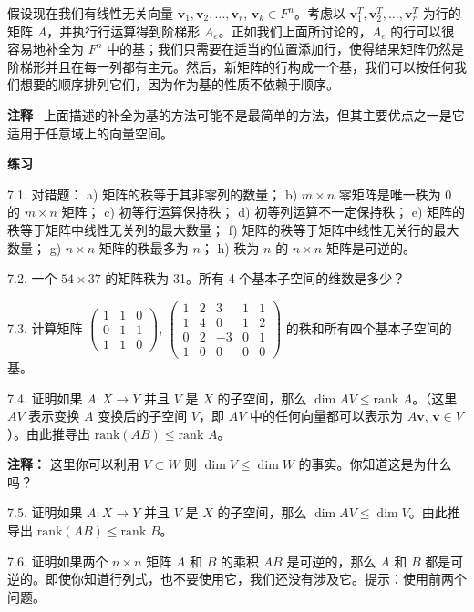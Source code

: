 假设现在我们有线性无关向量 $\mathbf{v}_1, \mathbf{v}_2, \dots, \mathbf{v}_r$, $\mathbf{v}_k \in F^n$。考虑以 $\mathbf{v}_1^T, \mathbf{v}_2^T, \dots, \mathbf{v}_r^T$ 为行的矩阵 $A$，并执行行运算得到阶梯形 $A_e$。正如我们上面所讨论的，$A_e$ 的行可以很容易地补全为 $F^n$ 中的基；我们只需要在适当的位置添加行，使得结果矩阵仍然是阶梯形并且在每一列都有主元。然后，新矩阵的行构成一个基，我们可以按任何我们想要的顺序排列它们，因为作为基的性质不依赖于顺序。

\textbf{注释}~ 上面描述的补全为基的方法可能不是最简单的方法，但其主要优点之一是它适用于任意域上的向量空间。


\textbf{练习}~

7.1. 对错题：
a) 矩阵的秩等于其非零列的数量；
b) $m \times n$ 零矩阵是唯一秩为 0 的 $m \times n$ 矩阵；
c) 初等行运算保持秩；
d) 初等列运算不一定保持秩；
e) 矩阵的秩等于矩阵中线性无关列的最大数量；
f) 矩阵的秩等于矩阵中线性无关行的最大数量；
g) $n \times n$ 矩阵的秩最多为 $n$；
h) 秩为 $n$ 的 $n \times n$ 矩阵是可逆的。

7.2. 一个 $54 \times 37$ 的矩阵秩为 31。所有 4 个基本子空间的维数是多少？

7.3. 计算矩阵 $\begin{pmatrix} 1 & 1 & 0 \\ 0 & 1 & 1 \\ 1 & 1 & 0 \end{pmatrix}$, $\begin{pmatrix} 1 & 2 & 3 & 1 & 1 \\ 1 & 4 & 0 & 1 & 2 \\ 0 & 2 & -3 & 0 & 1 \\ 1 & 0 & 0 & 0 & 0 \end{pmatrix}$ 的秩和所有四个基本子空间的基。

7.4. 证明如果 $A: X \to Y$ 并且 $V$ 是 $X$ 的子空间，那么 $\dim AV \le \text{rank } A$。（这里 $AV$ 表示变换 $A$ 变换后的子空间 $V$，即 $AV$ 中的任何向量都可以表示为 $A \mathbf{v}$, $\mathbf{v} \in V$）。由此推导出 $\text{rank}(AB) \le \text{rank } A$。

\textbf{注释：} 这里你可以利用 $V \subset W$ 则 $\dim V \le \dim W$ 的事实。你知道这是为什么吗？

7.5. 证明如果 $A: X \to Y$ 并且 $V$ 是 $X$ 的子空间，那么 $\dim AV \le \dim V$。由此推导出 $\text{rank}(AB) \le \text{rank } B$。

7.6. 证明如果两个 $n \times n$ 矩阵 $A$ 和 $B$ 的乘积 $AB$ 是可逆的，那么 $A$ 和 $B$ 都是可逆的。即使你知道行列式，也不要使用它，我们还没有涉及它。提示：使用前两个问题。

